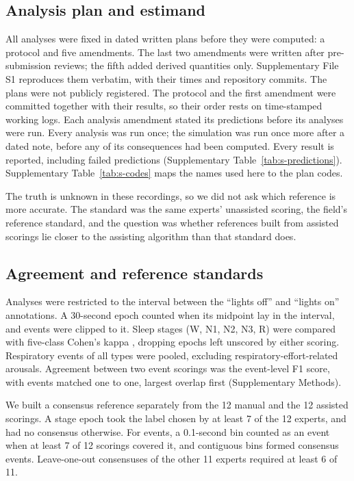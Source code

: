 \documentclass[11pt]{article}
\begin{document}
\subsection{Analysis plan and estimand}

All analyses were fixed in dated written plans before they were computed: a protocol and five amendments. The last
two amendments were written after pre-submission reviews; the fifth added derived quantities only. Supplementary
File S1 reproduces them verbatim, with their times and repository commits. The plans were not publicly registered.
The protocol and the first amendment were committed together with their results, so their order rests on
time-stamped working logs. Each analysis amendment stated its predictions before its analyses were run. Every
analysis was run once; the simulation was run once more after a dated note, before any of its consequences had been
computed. Every result is reported, including failed predictions (Supplementary Table~\ref{tab:s-predictions}). Supplementary Table~\ref{tab:s-codes} maps the names used here to the plan codes.

The truth is unknown in these recordings, so we did not ask which reference is more accurate. The standard was the
same experts' unassisted scoring, the field's reference standard, and the question was whether references built from
assisted scorings lie closer to the assisting algorithm than that standard does.

\subsection{Agreement and reference standards}

Analyses were restricted to the interval between the ``lights off'' and ``lights on'' annotations. A 30-second
epoch counted when its midpoint lay in the interval, and events were clipped to it. Sleep stages (W, N1, N2, N3, R)
were compared with five-class Cohen's kappa \citep{cohen1960}, dropping epochs left unscored by either scoring.
Respiratory events of all types were pooled, excluding respiratory-effort-related arousals. Agreement between two
event scorings was the event-level F1 score, with events matched one to one, largest overlap first (Supplementary
Methods).

We built a consensus reference separately from the 12 manual and the 12 assisted scorings. A stage epoch took the
label chosen by at least 7 of the 12 experts, and had no consensus otherwise. For events, a 0.1-second bin counted as
an event when at least 7 of 12 scorings covered it, and contiguous bins formed consensus events. Leave-one-out
consensuses of the other 11 experts required at least 6 of 11.
\end{document}
